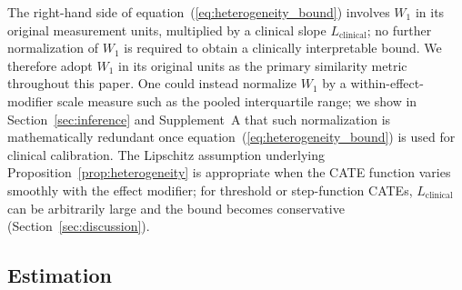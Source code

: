 \documentclass[AMA,Times1COL]{WileyNJDv5}
\begin{document}
The right-hand side of equation~(\ref{eq:heterogeneity_bound}) involves $W_1$ in its original measurement units, multiplied by a clinical slope $L_{\text{clinical}}$; no further normalization of $W_1$ is required to obtain a clinically interpretable bound. We therefore adopt $W_1$ in its original units as the primary similarity metric throughout this paper. One could instead normalize $W_1$ by a within-effect-modifier scale measure such as the pooled interquartile range; we show in Section~\ref{sec:inference} and Supplement~A that such normalization is mathematically redundant once equation~(\ref{eq:heterogeneity_bound}) is used for clinical calibration. The Lipschitz assumption underlying Proposition~\ref{prop:heterogeneity} is appropriate when the CATE function varies smoothly with the effect modifier; for threshold or step-function CATEs, $L_{\text{clinical}}$ can be arbitrarily large and the bound becomes conservative (Section~\ref{sec:discussion}).

\subsection{Estimation}\label{sec:estimation}
\end{document}
